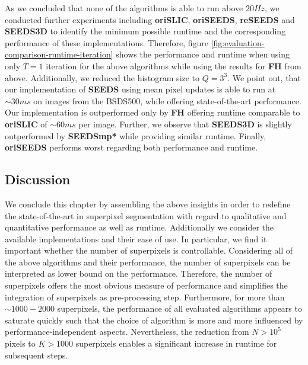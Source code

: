 As we concluded that none of the algorithms is able to run above $20Hz$, we conducted further experiments including \textbf{oriSLIC}, \textbf{oriSEEDS}, \textbf{reSEEDS} and \textbf{SEEDS3D} to identify the minimum possible runtime and the corresponding performance of these implementations. Therefore, figure \ref{fig:evaluation-comparison-runtime-iteration} shows the performance and runtime when using only $T = 1$ iteration for the above algorithms while using the results for \textbf{FH} from above. Additionally, we reduced the histogram size to $Q = 3^3$. We point out, that our implementation of \textbf{SEEDS} using mean pixel updates is able to run at $\sim 30ms$ on images from the BSDS500, while offering state-of-the-art performance. Our implementation is outperformed only by \textbf{FH} offering runtime comparable to \textbf{oriSLIC} of $\sim60ms$ per image. Further, we observe that \textbf{SEEDS3D} is slightly outperformed by \textbf{SEEDSmp*} while providing similar runtime. Finally, \textbf{oriSEEDS} performs worst regarding both performance and runtime.%

\subsection{Discussion}

We conclude this chapter by assembling the above insights in order to redefine the state-of-the-art in superpixel segmentation with regard to qualitative and quantitative performance as well as runtime. Additionally we consider the available implementations and their ease of use. In particular, we find it important whether the number of superpixels is controllable. Considering all of the above algorithms and their performance, the number of superpixels can be interpreted as lower bound on the performance. Therefore, the number of superpixels offers the most obvious measure of performance and simplifies the integration of superpixels as pre-processing step. Furthermore, for more than $\sim1000-2000$ superpixels, the performance of all evaluated algorithms appears to saturate quickly such that the choice of algorithm is more and more influenced by performance-independent aspects. Nevertheless, the reduction from $N > 10^5$ pixels to $K > 1000$ superpixels enables a significant increase in runtime for subsequent steps.

